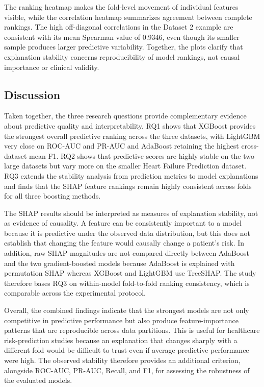 The ranking heatmap makes the fold-level movement of individual features
visible, while the correlation heatmap summarizes agreement between complete
rankings. The high off-diagonal correlations in the Dataset 2 example are
consistent with its mean Spearman value of 0.9346, even though its smaller
sample produces larger predictive variability. Together, the plots clarify
that explanation stability concerns reproducibility of model rankings, not
causal importance or clinical validity.



\subsection{Discussion}

Taken together, the three research questions provide complementary evidence
about predictive quality and interpretability. RQ1 shows that XGBoost provides
the strongest overall predictive ranking across the three datasets, with
LightGBM very close on ROC-AUC and PR-AUC and AdaBoost retaining the highest
cross-dataset mean F1. RQ2 shows that predictive scores are highly stable on the
two large datasets but vary more on the smaller Heart Failure Prediction
dataset. RQ3 extends the stability analysis from prediction metrics to model
explanations and finds that the SHAP feature rankings remain highly consistent
across folds for all three boosting methods.

The SHAP results should be interpreted as measures of explanation stability,
not as evidence of causality. A feature can be consistently important to a
model because it is predictive under the observed data distribution, but this
does not establish that changing the feature would causally change a patient's
risk. In addition, raw SHAP magnitudes are not compared directly between
AdaBoost and the two gradient-boosted models because AdaBoost is explained with
permutation SHAP whereas XGBoost and LightGBM use TreeSHAP. The study therefore
bases RQ3 on within-model fold-to-fold ranking consistency, which is comparable
across the experimental protocol.

Overall, the combined findings indicate that the strongest models are not only
competitive in predictive performance but also produce feature-importance
patterns that are reproducible across data partitions. This is useful for
healthcare risk-prediction studies because an explanation that changes sharply
with a different fold would be difficult to trust even if average predictive
performance were high. The observed stability therefore provides an additional
criterion, alongside ROC-AUC, PR-AUC, Recall, and F1, for assessing the
robustness of the evaluated models.
